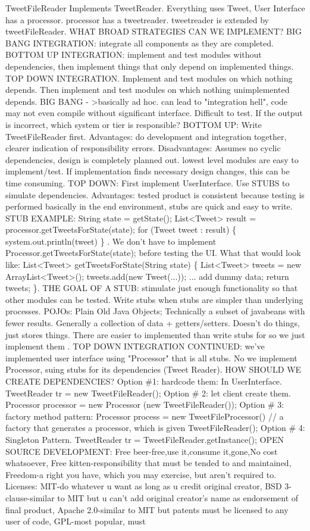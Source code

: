 \documentclass[10pt]{article}
\begin{document}
\begin{landscape}
\begin{multicols*}{6}
TweetFileReader Implements TweetReader. Everything uses Tweet, User Interface has a processor. processor has a tweetreader. tweetreader is extended by tweetFileReader. WHAT BROAD STRATEGIES CAN WE IMPLEMENT? BIG BANG INTEGRATION: integrate all components as they are completed. BOTTOM UP INTEGRATION: implement and test modules without dependencies, then implement things that only depend on implemented things. TOP DOWN INTEGRATION. Implement and test modules on which nothing depends. Then implement and test modules on which nothing unimplemented depends. BIG BANG - >basically ad hoc. can lead to "integration hell", code may not even compile without significant interface. Difficult to test. If the output is incorrect, which system or tier is responsible? BOTTOM UP: Write TweetFileReader first. Advantages: do development and integration together, clearer indication of responsibility errors. Disadvantages: Assumes no cyclic dependencies, design is completely planned out. lowest level modules are easy to implement/test. If implementation finds necessary design changes, this can be time consuming. TOP DOWN: First implement UserInterface. Use STUBS to simulate dependencies. Advantages: tested product is consistent because testing is performed basically in the end environment, stubs are quick and easy to write. STUB EXAMPLE: String state = getState(); List<Tweet> result = processor.getTweetsForState(state); for (Tweet tweet : result) \{ system.out.println(tweet) \} . We don't have to implement Processor.getTweetsForState(state); before testing the UI. What that would look like: List<Tweet> getTweetsForState(String state) \{ List<Tweet> tweets = new ArrayList<Tweet>(); tweets.add(new Tweet(...)); ... add dummy data; return tweets; \}. THE GOAL OF A STUB: stimulate just enough functionality so that other modules can be tested. Write stubs when stubs are simpler than underlying processes. POJOs: Plain Old Java Objects; Technically a subset of javabeans with fewer results. Generally a collection of data + getters/setters.  Doesn't do things, just stores things. There are easier to implemented than write stubs for so we just implement them . TOP DOWN INTEGRATION CONTINUED: we've implemented user interface using "Processor" that is all stubs. No we implement Processor, suing stubs for its dependencies (Tweet Reader). HOW SHOULD WE CREATE DEPENDENCIES? Option \#1: hardcode them: In UserInterface. TweetReader tr = new TweetFileReader(); Option \# 2: let client create them. Processor processor = new Processor (new TweetFileReader()); Option \# 3: factory method pattern: Processor process = new TweetFileProcessor() // a factory that generates a processor, which is given TweetFileReader(); Option \# 4: Singleton Pattern. TweetReader tr = TweetFileReader.getInstance();  OPEN SOURCE DEVELOPMENT: Free beer-free,use it,consume it,gone,No cost whatsoever, Free kitten-responsibility that must be tended to and maintained, Freedom-a right you have, which you may exercise, but aren't required to. Licenses: MIT-do whatever u want as long as u credit original creator, BSD 3-clause-similar to MIT but u can't add original creator's name as endorsement of final product, Apache 2.0-similar to MIT but patents must be licensed to any user of code, GPL-most popular, must 
\end{multicols*}
\end{landscape}
\end{document}
